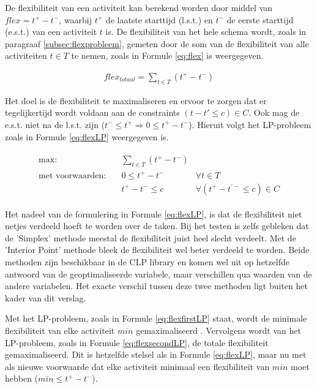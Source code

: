 De flexibiliteit van een activiteit kan berekend worden door middel van $flex = t^+ - t^-$, waarbij $t^+$ de laatste starttijd (l.s.t.) en $t^-$ de eerste starttijd (e.s.t.) van een activiteit $t$ is. De flexibiliteit van het hele schema wordt, zoals in paragraaf \ref{subsec:flexprobleem}, gemeten door de som van de flexibiliteit van alle activiteiten $t \in T$ te nemen, zoals in Formule \ref{eq:flex} is weergegeven. 

\begin{align}
\label{eq:flex}
    flex_{totaal} = \sum_{t \in T} (t^+ - t^-)
\end{align}

Het doel is de flexibiliteit te maximaliseren en ervoor te zorgen dat er tegelijkertijd wordt voldaan aan de constraints $(t - t' \leq c) \in C$. Ook mag de e.s.t. niet na de l.s.t. zijn ($t^- \leq t^+ \Rightarrow 0 \leq t^+ - t^-$). Hieruit volgt het LP-probleem zoals in Formule \ref{eq:flexLP} weergegeven is.

\begin{align}
\label{eq:flexLP}
\begin{aligned}
        \text{max:}& \quad \sum_{t \in T} (t^+ - t^-) & \\
 \text{met voorwaarden:}& \quad 0 \leq t^+ - t^- & \forall t \in T \\
                   & \quad t^+ - t^- \leq c & \forall (t^+ - t^{'-} \leq c) \in C
\end{aligned}
\end{align}

Het nadeel van de formulering in Formule \ref{eq:flexLP}, is dat de flexibiliteit niet netjes verdeeld hoeft te worden over de taken. Bij het testen is zelfs gebleken dat de 'Simplex' methode meestal de flexibiliteit juist heel slecht verdeelt. Met de 'Interior Point' methode bleek de flexibiliteit wel beter verdeeld te worden. Beide methoden zijn beschikbaar in de CLP library en komen wel uit op hetzelfde antwoord van de geoptimaliseerde variabele, maar verschillen qua waarden van de andere variabelen. Het exacte verschil tussen deze twee methoden ligt buiten het kader van dit verslag.

Met het LP-probleem, zoals in Formule \ref{eq:flexfirstLP} staat, wordt de minimale flexibiliteit van elke activiteit $min$ gemaximaliseerd \cite{wilmer13}. Vervolgens wordt van het LP-probleem, zoals in Formule \ref{eq:flexsecondLP}, de totale flexibiliteit gemaximaliseerd. Dit is hetzelfde stelsel als in Formule \ref{eq:flexLP}, maar nu met als nieuwe voorwaarde dat elke activiteit minimaal een flexibiliteit van $min$ moet hebben ($min \leq t^+ - t^ -$). 

